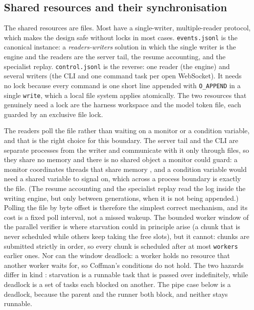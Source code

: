 \subsection{Shared resources and their synchronisation}

The shared resources are files. Most have a single-writer, multiple-reader
protocol, which makes the design safe without locks in most cases.
\texttt{events.jsonl} is the canonical instance: a \emph{readers-writers}
solution in which the single writer is the engine and the readers are the server
tail, the resume accounting, and the specialist replay. \texttt{control.jsonl}
is the reverse: one reader (the engine) and several writers (the CLI and one
command task per open WebSocket). It needs no lock because every command is one
short line appended with \texttt{O\_APPEND} in a single \texttt{write}, which a
local file system applies atomically. The two
resources that genuinely need a lock are the harness workspace and the model
token file, each guarded by an exclusive file lock.


The readers poll the file rather than waiting on a monitor or a condition
variable, and that is the right choice for this boundary. The server tail and the CLI are separate processes from the writer and
communicate with it only through files, so they share no memory and there is no shared object a monitor could guard: a monitor
coordinates threads that share memory \citep{hoare1974monitors}, and a condition
variable would need a shared variable to signal on, which across a process
boundary is exactly the file. (The resume accounting and the specialist replay
read the log inside the writing engine, but only between generations, when it
is not being appended.) Polling the file by byte offset is therefore the
simplest correct mechanism, and its cost is a fixed poll interval, not a missed
wakeup. The bounded worker window of the parallel verifier is where starvation
could in principle arise (a chunk that is never scheduled while others keep
taking the free slots), but it cannot: chunks are submitted strictly in order,
so every chunk is scheduled after at most \texttt{workers} earlier ones. Nor can
the window deadlock: a worker holds no resource that another worker waits for,
so Coffman's conditions do not hold. The two hazards differ in kind \citep{herlihy2012art}: starvation
is a runnable task that is passed over indefinitely, while deadlock is a set of
tasks each blocked on another. The pipe case below is a deadlock, because the
parent and the runner both block, and neither stays runnable.

